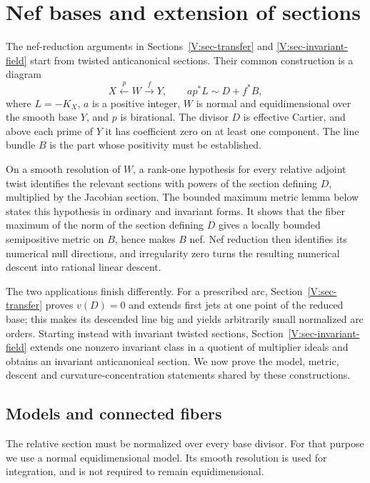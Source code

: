 \section{Nef bases and extension of sections}
\label{V:sec-nef}

The nef-reduction arguments in Sections~\ref{V:sec-transfer} and
\ref{V:sec-invariant-field} start from twisted anticanonical sections.
Their common construction is a diagram
\[
 X\xleftarrow{p}W\xrightarrow{f}Y,
 \qquad ap^*L\sim D+f^*B,
\]
where $L=-K_X$, $a$ is a positive integer, $W$ is normal and
equidimensional over the smooth base $Y$, and $p$ is birational.
The divisor $D$ is effective Cartier, and above each prime of $Y$ it has
coefficient zero on at least one component.  The line bundle $B$ is
the part whose positivity must be established.

On a smooth resolution of $W$, a rank-one hypothesis for every relative
adjoint twist identifies the relevant sections with powers of the section
defining $D$, multiplied by the Jacobian section.  The bounded maximum
metric lemma below states this hypothesis in ordinary and invariant
forms.  It shows that the fiber maximum of the norm of the section defining $D$
gives a locally bounded semipositive metric on $B$, hence makes $B$
nef.  Nef reduction then identifies its numerical null directions, and
irregularity zero turns the resulting numerical descent into rational
linear descent.

The two applications finish differently.  For a prescribed arc,
Section~\ref{V:sec-transfer} proves $v(D)=0$ and extends first jets at
one point of the reduced base; this makes its descended line big and
yields arbitrarily small normalized arc orders.  Starting instead with
invariant twisted sections, Section~\ref{V:sec-invariant-field} extends
one nonzero invariant class in a quotient of multiplier ideals and
obtains an invariant anticanonical section.  We now prove the model,
metric, descent and curvature-concentration statements shared by these
constructions.

\subsection{Models and connected fibers}

The relative section must be normalized over every base divisor.
For that purpose we use a normal equidimensional model.  Its smooth
resolution is used for integration, and is not required to remain
equidimensional.

